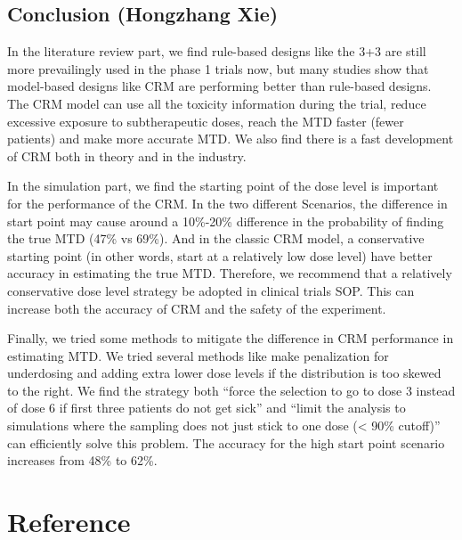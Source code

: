 \documentclass[
]{article}
\begin{document}
\hypertarget{conclusion-hongzhang-xie}{%
\subsection{Conclusion (Hongzhang Xie)}\label{conclusion-hongzhang-xie}}

In the literature review part, we find rule-based designs like the 3+3
are still more prevailingly used in the phase 1 trials now, but many
studies show that model-based designs like CRM are performing better
than rule-based designs. The CRM model can use all the toxicity
information during the trial, reduce excessive exposure to
subtherapeutic doses, reach the MTD faster (fewer patients) and make
more accurate MTD. We also find there is a fast development of CRM both
in theory and in the industry.

In the simulation part, we find the starting point of the dose level is
important for the performance of the CRM. In the two different
Scenarios, the difference in start point may cause around a 10\%-20\%
difference in the probability of finding the true MTD (47\% vs 69\%).
And in the classic CRM model, a conservative starting point (in other
words, start at a relatively low dose level) have better accuracy in
estimating the true MTD. Therefore, we recommend that a relatively
conservative dose level strategy be adopted in clinical trials SOP. This
can increase both the accuracy of CRM and the safety of the experiment.

Finally, we tried some methods to mitigate the difference in CRM
performance in estimating MTD. We tried several methods like make
penalization for underdosing and adding extra lower dose levels if the
distribution is too skewed to the right. We find the strategy both
``force the selection to go to dose 3 instead of dose 6 if first three
patients do not get sick'' and ``limit the analysis to simulations where
the sampling does not just stick to one dose (\textless{} 90\% cutoff)''
can efficiently solve this problem. The accuracy for the high start
point scenario increases from 48\% to 62\%.

\hypertarget{reference}{%
\section*{Reference}\label{reference}}
\end{document}
